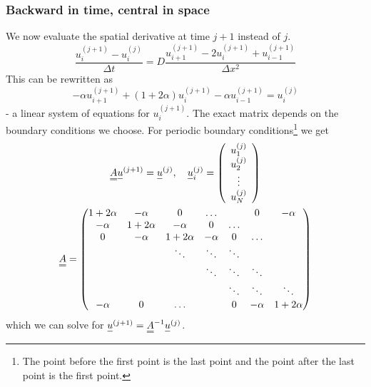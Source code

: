 \subsubsection{Backward in time, central in space}
We now evaluate the spatial derivative at time $j+1$ instead of $j$.
\begin{equation}
    \frac{u_i^{(j+1)} - u_i^{(j)}}{\Delta t} = D \frac{u_{i+1}^{(j+1)}-2 u_{i}^{(j+1)}+u_{i-1}^{(j+1)}}{\Delta x^2}
\end{equation}
This can be rewritten as
\begin{equation}
     -\alpha u_{i+1}^{(j+1)} + (1+2\alpha) u_i^{(j+1)} - \alpha u_{i-1}^{(j+1)} = u_i^{(j)}
\end{equation}
- a linear system of equations for $u_i^{(j+1)}$.
The exact matrix depends on the boundary conditions we choose. For periodic boundary conditions\footnote{The point before the 
first point is the last point and the point after the last point is the first point.} we get
\begin{equation}
    \begin{gathered}
        \mat{A} \vec{u}^{(j+1)} = \vec{u}^{(j)}, \quad \vec{u}_i^{(j)} = \left( \begin{array}{c}
            u_1^{(j)} \\
            u_2^{(j)} \\
            \vdots \\
            u_{N}^{(j)}
        \end{array} \right) \\
        \mat{A} = \begin{pmatrix}
            1+2\alpha & -\alpha & 0 & \dots &  & 0 & -\alpha \\
            -\alpha & 1+2\alpha & -\alpha & 0 & \dots &  &  \\
            0 & -\alpha & 1+2\alpha & -\alpha & 0 & \dots &  \\
             &  & \ddots & \ddots & \ddots &  &  \\
            &  &  & \ddots & \ddots & \ddots &  \\
            & &  & & \ddots  & \ddots  & \ddots  \\
            -\alpha & 0 & \dots &  & 0 & -\alpha & 1+2\alpha
        \end{pmatrix}
    \end{gathered}
\end{equation}
which we can solve for $\vec{u}^{(j+1)} = \mat{A}^{-1} \vec{u}^{(j)}$.

